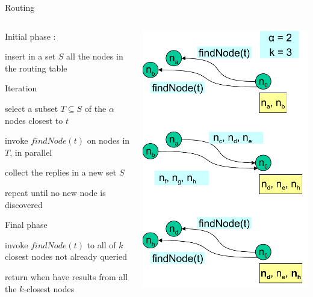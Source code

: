 \begin{frame}{Routing}

\begin{columns}
\begin{column}{0.65\textwidth}
\BI
\item \alert{Initial phase} :
	\BI
	\item insert in a set $S$ all the nodes in the routing table
	\EI
\item \alert{Iteration}
	\BI
	\item select a subset $T \subseteq S$ of the $\alpha$ nodes closest to $t$
	\item invoke $\mathit{findNode}(t)$ on nodes in $T$, \alert{in parallel}
	\item collect the replies in a new set $S$
	\item repeat until no new node is discovered 
	\EI
\item \alert{Final phase}
	\BI
	\item invoke $\mathit{findNode}(t)$ to all of $k$ closest nodes not already queried
	\item return when have results from all the $k$-closest nodes
	\EI
\EI
\end{column}
\begin{column}{0.35\textwidth}
\includegraphics[width=\textwidth]{kad-routing}

\end{column}
\end{columns}
\end{frame}
